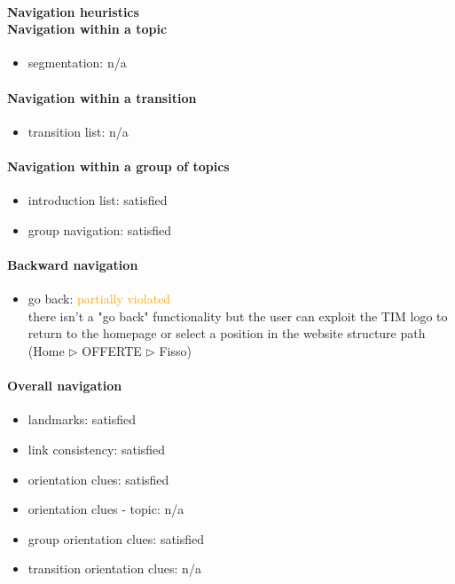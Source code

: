 \begin{enumerate}
	\paragraph*{Navigation heuristics \\ Navigation within a topic}
	\begin{itemize}
		\item segmentation: n/a
	\end{itemize}	
	
	\paragraph*{Navigation within a transition}
	\begin{itemize}
		\item transition list: n/a
	\end{itemize}
	
	\paragraph*{Navigation within a group of topics}
	\begin{itemize}
		\item introduction list: satisfied
		\item group navigation: satisfied
	\end{itemize}

	\paragraph*{Backward navigation}
	\begin{itemize}
		\item go back: \textcolor {orange}{partially violated}\\
		there isn't a "go back" functionality but the user can exploit the TIM logo to return to the homepage or select a position in the website structure path (Home $\triangleright$ OFFERTE $\triangleright$ Fisso)
	\end{itemize}
	
	\paragraph*{Overall navigation}
	\begin{itemize}
		\item landmarks: satisfied
		\item link consistency: satisfied
		\item orientation clues: satisfied
		\item orientation clues - topic: n/a
		\item group orientation clues: satisfied
		\item transition orientation clues: n/a
	\end{itemize}	
	

\end{enumerate}
